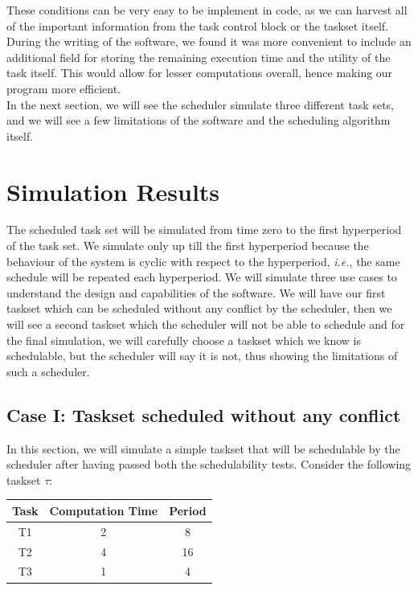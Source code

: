 These conditions can be very easy to be implement in code, as we can harvest all of the important information from the task control block or the taskset itself. During the writing of the software, we found it was more convenient to include an additional field for storing the remaining execution time and the utility of the task itself. This would allow for lesser computations overall, hence making our program more efficient.\\

In the next section, we will see the scheduler simulate three different task sets, and we will see a few limitations of the software and the scheduling algorithm itself.

\section{Simulation Results}\label{sec:sim-results}
The scheduled task set will be simulated from time zero to the first hyperperiod of the task set. We simulate only up till the first hyperperiod because the behaviour of the system is cyclic with respect to the hyperperiod, \textit{i.e.}, the same schedule will be repeated each hyperperiod. We will simulate three use cases to understand the design and capabilities of the software. We will have our first taskset which can be scheduled without any conflict by the scheduler, then we will see a second taskset which the scheduler will not be able to schedule and for the final simulation, we will carefully choose a taskset which we know is schedulable, but the scheduler will say it is not, thus showing the limitations of such a scheduler.\\
\subsection{Case I: Taskset scheduled without any conflict}

In this section, we will simulate a simple taskset that will be schedulable by the scheduler after having passed both the schedulability tests. Consider the following taskset $\tau$:
\begin{center}
\begin{tabular}{|c|c|c|}
  \hline
  Task & Computation Time & Period \\
  \hline
  T1 & 2 & 8 \\
  \hline
  T2 & 4 & 16 \\
  \hline
  T3 & 1 & 4 \\
  \hline
\end{tabular}
\end{center}

